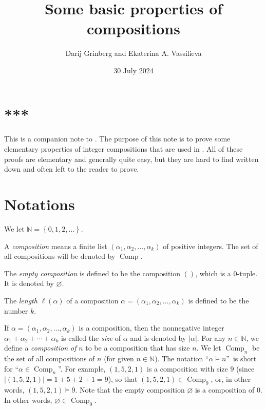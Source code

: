 \documentclass[numbers=enddot,12pt,final,onecolumn,notitlepage]{scrartcl}%
\theoremstyle{definition}
\begin{document}
\title{Some basic properties of compositions}
\author{Darij Grinberg and Ekaterina A. Vassilieva}
\date{30 July 2024}
\maketitle
\tableofcontents

\section*{***}

This is a companion note to \cite{main}. The purpose of this note is to prove
some elementary properties of integer compositions that are used in
\cite{main}. All of these proofs are elementary and generally quite easy, but
they are hard to find written down and often left to the reader to prove.

\section{Notations}

We let $\mathbb{N}=\left\{  0,1,2,\ldots\right\}  $.

A \emph{composition} means a finite list $\left(  \alpha_{1},\alpha_{2}%
,\ldots,\alpha_{k}\right)  $ of positive integers. The set of all compositions
will be denoted by $\operatorname*{Comp}$.

The \emph{empty composition }is defined to be the composition $\left(
{}\right)  $, which is a $0$-tuple. It is denoted by $\varnothing$.

The \emph{length }$\ell\left(  \alpha\right)  $ of a composition
$\alpha=\left(  \alpha_{1},\alpha_{2},\ldots,\alpha_{k}\right)  $ is defined
to be the number $k$.

If $\alpha=\left(  \alpha_{1},\alpha_{2},\ldots,\alpha_{k}\right)  $ is a
composition, then the nonnegative integer $\alpha_{1}+\alpha_{2}+\cdots
+\alpha_{k}$ is called the \emph{size} of $\alpha$ and is denoted by
$\left\vert \alpha\right\vert $. For any $n\in\mathbb{N}$, we define a
\emph{composition of }$n$ to be a composition that has size $n$. We let
$\operatorname*{Comp}\nolimits_{n}$ be the set of all compositions of $n$ (for
given $n\in\mathbb{N}$). The notation \textquotedblleft$\alpha\models
n$\textquotedblright\ is short for \textquotedblleft$\alpha\in
\operatorname*{Comp}\nolimits_{n}$\textquotedblright. For example, $\left(
1,5,2,1\right)  $ is a composition with size $9$ (since $\left\vert \left(
1,5,2,1\right)  \right\vert =1+5+2+1=9$), so that $\left(  1,5,2,1\right)
\in\operatorname*{Comp}\nolimits_{9}$, or, in other words, $\left(
1,5,2,1\right)  \models9$. Note that the empty composition $\varnothing$ is a
composition of $0$. In other words, $\varnothing\in\operatorname*{Comp}%
\nolimits_{0}$.
\end{document}
